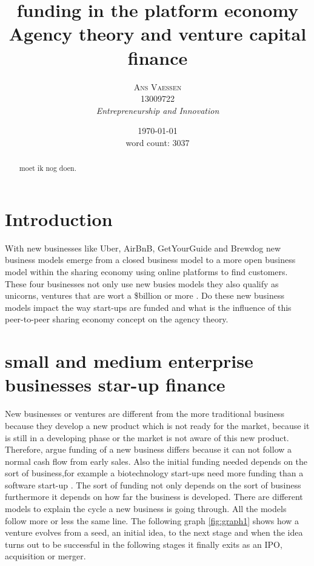 \documentclass[a4paper, 11pt]{article}
\title{\textbf{funding in the platform economy}\\Agency theory and venture capital finance}
\author{\textsc{Ans Vaessen}
\\13009722
\\{\textit{Entrepreneurship and Innovation}}}
\date{\today\\
word count: 3037}
\begin{document}
\maketitle

\begin{abstract}
moet ik nog doen.
\end{abstract}



\vspace{30pt} %

\section*{Introduction}


With new businesses like Uber, AirBnB, GetYourGuide and Brewdog new business models emerge from a closed business model to a more open business model within the sharing economy using online platforms to find customers. These four businesses not only use new busies models they also qualify as unicorns, ventures that are wort a \$billion or more \cite{TiddBessant}. Do these new business models impact the way start-ups are funded and what is the influence of this peer-to-peer sharing economy concept on the agency theory.

\section{small and medium enterprise businesses star-up finance}

New businesses or ventures are different from the more traditional business because they develop a new product which is not ready for the market, because it is still in a developing phase or the market is not aware of this new product. Therefore, \cite{TiddBessant} argue funding of a new business differs because it can not follow a normal cash flow from early sales. Also the initial funding needed depends on the sort of business,for example a biotechnology start-ups need more funding than a software start-up \citep{TiddBessant}. The sort of funding not only depends on the sort of business furthermore it depends on how far the business is developed. There are different models to explain the cycle a new business is going through. All the models follow more or less the same line. The following graph  \ref{fig:graph1} shows how a venture evolves from a seed, an initial idea, to the next stage and when the idea turns out to be successful in the following stages it finally exits as an IPO, acquisition or merger.
\end{document}
